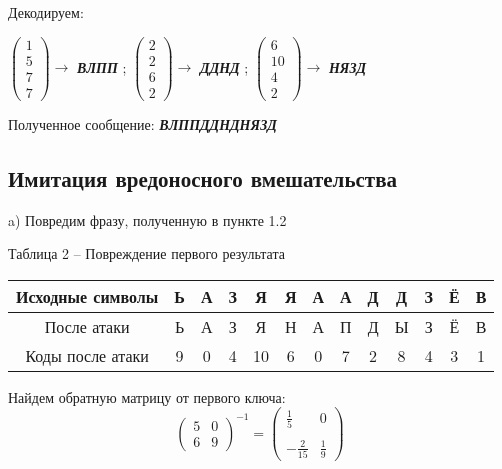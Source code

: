 \documentclass[a5paper, 10pt]{article}
\theoremstyle{definition}
\theoremstyle{plain}
\theoremstyle{remark}
\begin{document}
Декодируем:
\begin{center}
 $ \begin{pmatrix}
 1\\
5\\
7\\
7
\end{pmatrix} \to$ \textbf{\textit{ВЛПП}} ;
 $ \begin{pmatrix}
 2\\
2 \\
6\\
2
\end{pmatrix} \to$ \textbf{\textit{ДДНД}} ;
 $ \begin{pmatrix}
 6\\
10\\
4\\
2
\end{pmatrix} \to$ \textbf{\textit{НЯЗД}} 
 \\

\end{center}
Полученное сообщение:  \textbf{\textit{ВЛППДДНДНЯЗД}}

\subsection{Имитация вредоносного вмешательства}
 a) Повредим фразу, полученную в пункте 1.2
\begin{center}
Таблица 2 -- Повреждение первого результата\\
\begin{tabular}{ |c|c|c|c|c|c|c|c|c|c|c|c|c| } 
 \hline
Исходные символы & Ь & А & З & Я & Я  & А & А  & Д & Д  & З & Ё  & В\\
\hline
После атаки & Ь & А & З & Я & Н  & А & П  & Д & Ы  & З & Ё  & В \\
 \hline
Коды после атаки & 9 & 0 & 4 & 10 & 6  & 0 & 7  & 2 & 8  & 4 & 3  & 1  \\
 \hline
\end{tabular}
\end{center}
Найдем обратную матрицу от первого ключа:
\begin{equation}
\begin{pmatrix}
 5 & 0\\
 6 & 9
\end{pmatrix} ^{-1}
= 
\begin{pmatrix}
 \frac{1}{5} & 0\\
\\
 - \frac{2}{15} &  \frac{1}{9}
\end{pmatrix}
\end{equation}
\end{document}
